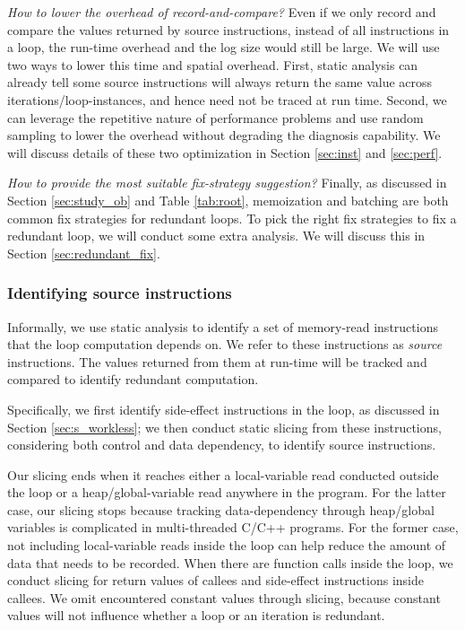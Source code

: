 \emph{How to lower the overhead of record-and-compare?}
Even if we only record and compare the values returned by source instructions,
instead of all instructions in a loop, the run-time overhead and the log size
would still be large. We will use two ways to lower this time and spatial
overhead. First, static analysis can already tell some source instructions
will always return the same value across iterations/loop-instances, and hence
need not be traced at run time. Second, we can leverage the repetitive nature
of performance problems and use random sampling to lower the overhead without
degrading the diagnosis capability. We will discuss details of 
these two optimization in Section \ref{sec:inst} and \ref{sec:perf}.

\emph{How to provide the most suitable fix-strategy suggestion?}
Finally, as discussed in Section \ref{sec:study_ob} and Table \ref{tab:root},
memoization and batching are both common fix strategies for redundant loops.
To pick the right fix strategies to fix a redundant loop, we will conduct 
some extra analysis. We will discuss this in Section \ref{sec:redundant_fix}.


\subsubsection{Identifying source instructions}
\label{sec:dependence}

Informally, we use static analysis to identify a set of 
memory-read instructions that the loop computation depends on. We refer
to these instructions as \textit{source} instructions. The values returned
from them at run-time will be tracked and compared to identify
redundant computation.

Specifically, we first identify side-effect instructions in the loop, as 
discussed in Section \ref{sec:s_workless}; we then conduct static slicing 
from these instructions, considering both control and data
dependency, to identify source instructions.

Our slicing ends when it reaches either a local-variable read conducted
outside the loop or a heap/global-variable read anywhere in the program.
For the latter case, our slicing stops because tracking data-dependency
through heap/global variables is complicated in multi-threaded C/C++
programs. For the former case, 
not including local-variable reads inside the loop can help reduce the
amount of data that needs to be recorded. 
When there are function calls inside the loop,  
we conduct slicing for return values of callees and side-effect instructions
inside callees. 
We omit encountered constant values through slicing, because constant values will not influence whether a loop or an iteration is redundant. 


